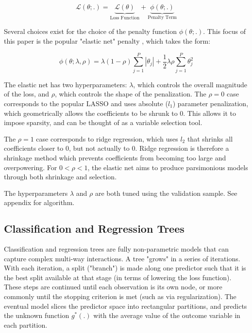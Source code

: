 \documentclass[a4paper]{article}
\newcommand{\smalltodo}[2][] {\todo[caption={#2}, size=\scriptsize,%
	fancyline,#1]{\begin{spacing}{.5}#2\end{spacing}}}
\newcommand{\rhs}[2][]{\smalltodo[color=green!30,#1]{{\bf RS:} #2}}
\begin{document}
\begin{equation}
	\mathcal{L(\theta;.)} = 
	\underset{\text{Loss Function}}{\underbrace{\mathcal{L(\theta)}}} + 
	\underset{\text{Penalty Term}}{\underbrace{\phi(\theta;.)}}
\end{equation}

Several choices exist for the choice of the penalty function \( \phi(\theta;.) \). This focus of this paper is the popular "elastic net" penalty  \citep{zou_regularization_2005}, which takes the form:

\begin{equation}
	\phi(\theta;\lambda,\rho) = 
	\lambda(1-\rho) \sum_{j = 1}^{P}|\theta_j| +
	\frac{1}{2} \lambda \rho \sum_{j = 1}^{P}\theta_j^2
\end{equation}

The elastic net has two hyperparameters: $\lambda$, which controls the overall magnitude of the loss, and $\rho$, which controls the shape of the penalization. The $\rho = 0$ case corresponds to the popular LASSO and uses absolute ($l_1$) parameter penalization, which geometrically allows the coefficients to be shrunk to 0. This allows it to impose sparsity, and can be thought of as a variable selection tool.

The $\rho = 1$ case corresponds to ridge regression, which uses $l_2$ that shrinks all coefficients closer to 0, but not actually to 0. Ridge regression is therefore a shrinkage method which prevents coefficients from becoming too large and overpowering. For \(0 < \rho < 1\), the elastic net aims to produce parsimonious models through both shrinkage and selection.

The hyperparameters $\lambda$ and $\rho$ are both tuned using the validation sample. See appendix for algorithm.

\rhs{update when algorithm is written}

\subsection{Classification and Regression Trees}

Classification and regression trees are fully non-parametric models that can capture complex multi-way interactions. A tree "grows" in a series of iterations. With each iteration, a split ("branch") is made along one predictor such that it is the best split available at that stage (in terms of lowering the loss function). These steps are continued until each observation is its own node, or more commonly until the stopping criterion is met (such as via regularization). The eventual model slices the predictor space into rectangular partitions, and predicts the unknown function $g^*(.)$ with the average value of the outcome variable in each partition.
\end{document}
